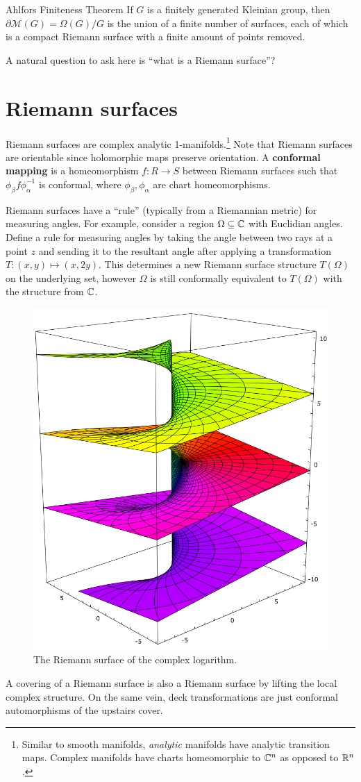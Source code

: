 \begin{namedthm}{Ahlfors Finiteness Theorem} 
    If $G$ is a finitely generated Kleinian group, then $\partial \mathcal{M} (G) = \Omega(G) /G$ is the union of a finite number of surfaces, each of which is a compact Riemann surface with a finite amount of points removed.
\end{namedthm}
A natural question to ask here is ``what is a Riemann surface''?

\section{Riemann surfaces}

Riemann surfaces are complex analytic 1-manifolds.\footnote{Similar to smooth manifolds, \emph{analytic} manifolds have analytic transition maps. Complex manifolds have charts homeomorphic to $\mathbb{C}^n $ as opposed to $\mathbb{R}^n $.} Note that Riemann surfaces are orientable since holomorphic maps preserve orientation. A \textbf{conformal mapping} is a homeomorphism $f \colon R \to S$ between Riemann surfaces such that $\phi_{\beta }f \phi_{\alpha }^{-1}$ is conformal, where $\phi_{\beta },\phi_{\alpha }$ are chart homeomorphisms. 

Riemann surfaces have a ``rule'' (typically from a Riemannian metric) for measuring angles. For example, consider a region $\Omega \subseteq \mathbb{C}$ with Euclidian angles. Define a rule for measuring angles by taking the angle between two rays at a point $z$ and sending it to the resultant angle after applying a transformation $T\colon (x,y) \mapsto (x,2y)$. This determines a new Riemann surface structure $T(\Omega)$ on the underlying set, however $\Omega$ is still conformally equivalent to $T(\Omega)$ with the structure from $\mathbb{C}$.

\begin{figure}[H]
\centering
 \includegraphics[width=0.4\linewidth]{figures/hyp4.png}
 \caption{The Riemann surface of the complex logarithm.} 
\end{figure}
A covering of a Riemann surface is also a Riemann surface by lifting the local complex structure. On the same vein, deck transformations are just conformal automorphisms of the upstairs cover.

